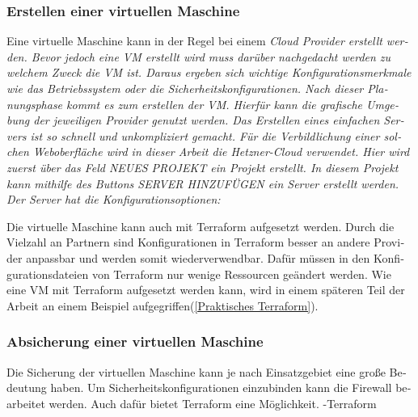 \begin{otherlanguage}{ngerman}
\subsubsection{Erstellen einer virtuellen Maschine}
Eine virtuelle Maschine kann in der Regel bei einem \it Cloud Provider \rm erstellt werden.  Bevor jedoch eine VM erstellt wird muss darüber nachgedacht werden zu welchem Zweck die VM ist. Daraus ergeben sich wichtige Konfigurationsmerkmale wie das Betriebssystem oder die Sicherheitskonfigurationen. Nach dieser Planungsphase kommt es zum erstellen der VM. Hierfür kann die grafische Umgebung der jeweiligen Provider genutzt werden. Das Erstellen eines einfachen Servers ist so schnell und unkompliziert gemacht. Für die Verbildlichung einer solchen Weboberfläche wird in dieser Arbeit die \it Hetzner-Cloud \rm verwendet. Hier wird zuerst über das Feld \dq NEUES PROJEKT\dq{} ein Projekt erstellt. In diesem Projekt kann mithilfe des Buttons \dq SERVER HINZUFÜGEN\dq{} ein Server erstellt werden. Der Server hat die Konfigurationsoptionen:
\begin{acronym}
\end{acronym}
\newline
\newline
Die virtuelle Maschine kann auch mit Terraform aufgesetzt werden. Durch die Vielzahl an Partnern sind Konfigurationen in Terraform besser an andere Provider anpassbar und werden somit wiederverwendbar. Dafür müssen in den Konfigurationsdateien von Terraform nur wenige Ressourcen geändert werden. Wie eine VM mit Terraform aufgesetzt werden kann, wird in einem späteren Teil der Arbeit an einem Beispiel aufgegriffen(\ref{Praktisches Terraform}).

\subsubsection{Absicherung einer virtuellen Maschine}
Die Sicherung der virtuellen Maschine kann je nach Einsatzgebiet eine große Bedeutung haben. Um Sicherheitskonfigurationen einzubinden kann die Firewall bearbeitet werden. Auch dafür bietet Terraform eine Möglichkeit. 
\newline 
-Terraform
\end{otherlanguage}